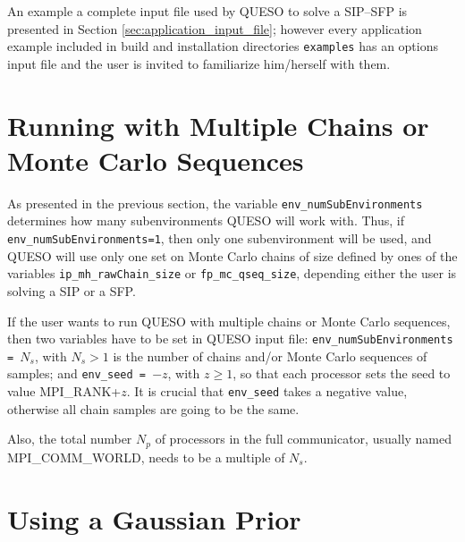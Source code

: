 An example a complete input file used by QUESO to solve a SIP--SFP is presented in Section \ref{sec:application_input_file}; however every application example included in \Queso{} build and installation directories \verb+examples+ has an options input file and the user is invited to familiarize him/herself with them.


\section{Running with Multiple Chains or Monte Carlo Sequences}

\new{}\vspace{-30pt}
\begin{leftbar}
 
As presented in the previous section, the variable \verb+env_numSubEnvironments+ determines how many subenvironments QUESO will work with. Thus, if \verb+env_numSubEnvironments=1+, then   only one subenvironment will be used, and QUESO will use only one set on Monte Carlo chains of size defined by ones of the variables \verb+ip_mh_rawChain_size+ or \verb+fp_mc_qseq_size+, depending either the user is solving a SIP or a SFP.

If the user wants to run QUESO with multiple chains or Monte Carlo sequences, then two variables have to be set in QUESO input file: \verb+env_numSubEnvironments = +$N_s$, with $N_s>1$ is the number of chains and/or Monte Carlo sequences of samples; and \verb+env_seed = +$-z$, with $z\geqslant 1$, so that each processor sets the seed to value MPI\_RANK+$z$.
It is crucial that \verb+env_seed+ takes a negative value, otherwise all chain samples are going to be the same.

Also, the total number $N_p$ of processors in the full communicator, usually named \linebreak MPI\_COMM\_WORLD, needs to be a multiple of $N_s$.
\end{leftbar}




\section{Using a Gaussian Prior}

